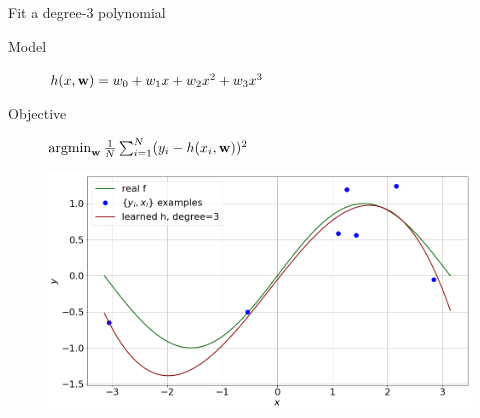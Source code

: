 \documentclass[lualatex, aspectratio=169]{beamer}
\begin{document}






\begin{frame}{Fit a degree-3 polynomial}

  \begin{description}
    \item[Model] $h(x, \mathbf{w}) = w_0 + w_1 x + w_2 x^2 + w_3 x^3$
    \item[Objective] $\argmin_{\v{w}} \frac{1}{N} \sum^N_{i=1} (y_i - h(x_i, \v{w}) )^2$ 
  \end{description}

  \begin{figure}
    \includegraphics[width=0.6\pagewidth]{assets/poly3.png}
  \end{figure}

\end{frame}
\end{document}
